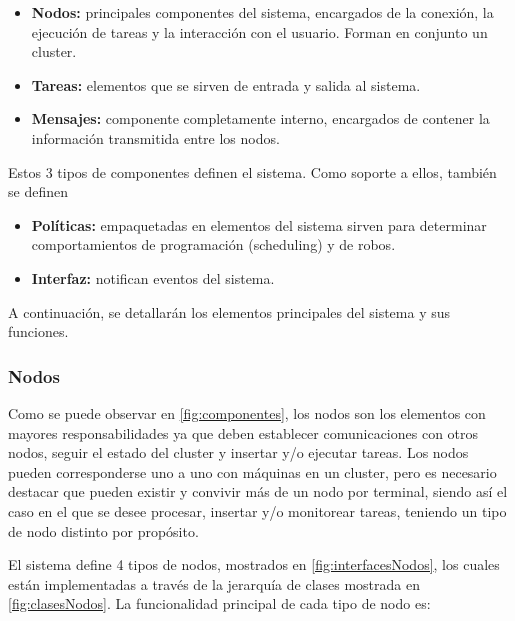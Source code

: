 \documentclass[12pt,a4paper,oneside,spanish]{report}
\begin{document}
\begin{itemize}
	\item \textbf{Nodos:} principales componentes del sistema, encargados de la conexión, la ejecución de tareas y la interacción con el usuario. Forman en conjunto un cluster.
	\item \textbf{Tareas:} elementos que se sirven de entrada y salida al sistema.
	\item \textbf{Mensajes:} componente completamente interno, encargados de contener la información transmitida entre los nodos.
\end{itemize}

Estos 3 tipos de componentes definen el sistema. Como soporte a ellos, también se definen

\begin{itemize}
	\item \textbf{Políticas:} empaquetadas en elementos del sistema sirven para determinar comportamientos de programación (scheduling) y de robos.
	\item \textbf{Interfaz:} notifican eventos del sistema.
\end{itemize}

A continuación, se detallarán los elementos principales del sistema y sus funciones.

\subsubsection*{Nodos}


Como se puede observar en \ref{fig:componentes}, los nodos son los elementos con mayores responsabilidades ya que deben establecer comunicaciones con otros nodos, seguir el estado del cluster y insertar y/o ejecutar tareas. Los nodos pueden corresponderse uno a uno con máquinas en un cluster, pero es necesario destacar que pueden existir y convivir más de un nodo por terminal, siendo así el caso en el que se desee procesar, insertar y/o monitorear tareas, teniendo un tipo de nodo distinto por propósito.

El sistema define 4 tipos de nodos, mostrados en \ref{fig:interfacesNodos}, los cuales están implementadas a través de la jerarquía de clases mostrada en \ref{fig:clasesNodos}. La funcionalidad principal de cada tipo de nodo es:
\end{document}
